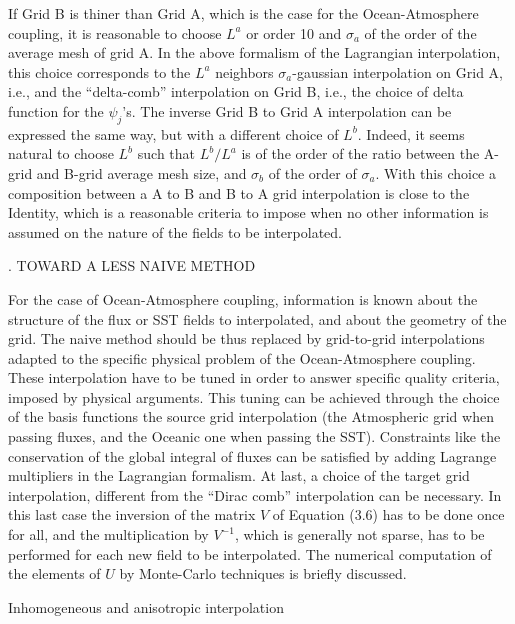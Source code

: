 If Grid B is thiner than Grid A, which is the case for the
Ocean-Atmosphere coupling, it is reasonable to choose $L^a$ or order 10
and $\sigma_a$ of the order of the average mesh of grid A. In the  above
formalism of the Lagrangian interpolation, this choice corresponds to 
the $L^a$ neighbors $\sigma_a$-gaussian interpolation on Grid A,  i.e.,
and the ``delta-comb'' interpolation on Grid B, i.e., the choice of delta
function for the $\psi_j$'s.  The inverse Grid B to Grid A interpolation can
be expressed the same way, but with a different choice of $L^b$. Indeed, it
seems natural to choose $L^b$ such that $L^b/L^a$ is of the order of the
ratio between the A-grid and B-grid average mesh size, and $\sigma_b$ of
the order of $\sigma_a$. With this choice a composition between a A to B
and B to A grid interpolation is close to the Identity, which is a reasonable
criteria to impose when no other information is assumed on the nature of
the fields to be interpolated. 







. TOWARD A LESS NAIVE METHOD

For the case of Ocean-Atmosphere coupling, information is known about
the structure of the flux or SST fields to interpolated, and about the
geometry of the   grid. The naive method should be thus replaced by
grid-to-grid interpolations adapted to the specific physical problem of the
Ocean-Atmosphere coupling. These interpolation have to be  tuned in order
to answer specific quality criteria, imposed by physical arguments.  This
tuning can be achieved through the choice of the basis functions  the
source grid interpolation (the Atmospheric grid when passing fluxes, and
the Oceanic one when passing the SST).  Constraints like the conservation
of the global integral of fluxes can be satisfied by adding Lagrange
multipliers in the Lagrangian  formalism. At last, a choice of the target
grid  interpolation, different from the ``Dirac comb'' interpolation can be
necessary. In this last case the inversion of the matrix $V$ of Equation
(3.6) has to be done once for all, and the multiplication by $V^{-1}$, which
is generally not sparse, has to  be performed for each new field to be
interpolated.  The numerical computation of the elements of $U$ by
Monte-Carlo techniques is briefly discussed.  



 Inhomogeneous and anisotropic interpolation

